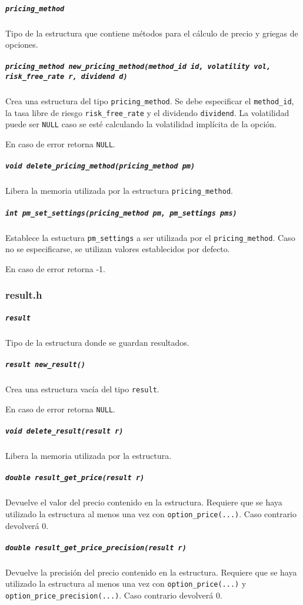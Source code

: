 \documentclass[12pt,a4paper,final]{article}
\begin{document}
			\subparagraph{\texttt{pricing\_method}}
				Tipo de la estructura que contiene métodos para el cálculo de precio y griegas
				de opciones.	
				
			\subparagraph{\texttt{pricing\_method new\_pricing\_method(method\_id id, volatility vol, risk\_free\_rate r, dividend d)}}
				Crea una estructura del tipo \texttt{pricing\_method}. Se debe especificar el \texttt{method\_id},
				la tasa libre de riesgo \texttt{risk\_free\_rate} y el dividendo \texttt{dividend}. La volatilidad
				puede ser \texttt{NULL} caso se esté calculando la volatilidad implícita de la opción.
				
				En caso de error retorna \texttt{NULL}.
				
			\subparagraph{\texttt{void delete\_pricing\_method(pricing\_method pm)}}
				Libera la memoria utilizada por la estructura \texttt{pricing\_method}.
				
			\subparagraph{\texttt{int pm\_set\_settings(pricing\_method pm, pm\_settings pms)}}
				Establece la estuctura \texttt{pm\_settings} a ser utilizada por el \texttt{pricing\_method}.
				Caso no se especificarse, se utilizan valores establecidos por defecto.
				
				En caso de error retorna -1.
												
		\subsubsection{result.h}
			\subparagraph{\texttt{result}}
				Tipo de la estructura donde se guardan resultados.
			
			\subparagraph{\texttt{result new\_result()}}
				Crea una estructura vacía del tipo \texttt{result}.
				
				En caso de error retorna \texttt{NULL}.
				
			\subparagraph{\texttt{void delete\_result(result r)}}
				Libera la memoria utilizada por la estructura.
				
			\subparagraph{\texttt{double result\_get\_price(result r)}}
				Devuelve el valor del precio contenido en la estructura.
				Requiere que se haya utilizado la estructura al menos una vez 
				con \texttt{option\_price(...)}. Caso contrario devolverá 0.
				
			\subparagraph{\texttt{double result\_get\_price\_precision(result r)}}
				Devuelve la precisión del precio contenido en la estructura.
				Requiere que se haya utilizado la estructura al menos una vez 
				con \texttt{option\_price(...)} y \texttt{option\_price\_precision(...)}. 
				Caso contrario devolverá 0.	
				
\end{document}
